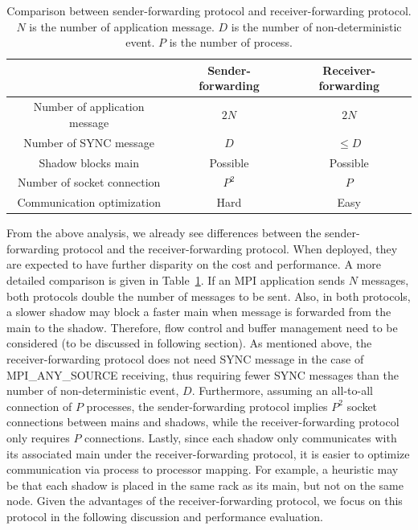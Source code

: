 \begin{table}[!h]
\caption{Comparison between sender-forwarding protocol and receiver-forwarding protocol. $N$ is the number of application message. $D$ is the number of non-deterministic event. $P$ is the number of process.}
\centering
\begin{tabular}{|c | c | c |}
\hline 
 & Sender-forwarding  & Receiver-forwarding  \\
\hline \hline 
Number of application message  & $2N$ & $2N$ \\
\hline
Number of SYNC message & $D$ &  $\le D$ \\
\hline
Shadow blocks main & Possible & Possible \\
\hline
Number of socket connection & $P^2$ & $P$ \\
\hline
Communication optimization & Hard & Easy \\
\hline
\end{tabular}
\label{tbl:cons_protocol_comp}
\end{table}

From the above analysis, we already see differences between the sender-forwarding protocol and the receiver-forwarding protocol. When deployed, they are expected to have further disparity on the cost and performance. 
A more detailed comparison is given in Table~\ref{tbl:cons_protocol_comp}. If an MPI application sends $N$ messages, both protocols double the number of messages to be sent. Also, in both protocols, a slower shadow may block a faster main when message is forwarded from the main to the shadow. Therefore, flow control and buffer management need to be considered (to be discussed in following section). As mentioned above, the receiver-forwarding protocol does not need SYNC message in the case of MPI\_ANY\_SOURCE receiving, thus requiring fewer SYNC messages than the number of non-deterministic event, $D$. Furthermore, assuming an all-to-all connection of $P$ processes, the sender-forwarding protocol implies $P^2$ socket connections between mains and shadows, while the receiver-forwarding protocol only requires $P$ connections. Lastly, since each shadow only communicates with its associated main under the receiver-forwarding protocol, it is easier to optimize communication via process to processor mapping. For example, a heuristic may be that each shadow is placed in the same rack as its main, but not on the same node. Given the advantages of the receiver-forwarding protocol, we focus on this protocol in the following discussion and performance evaluation.



